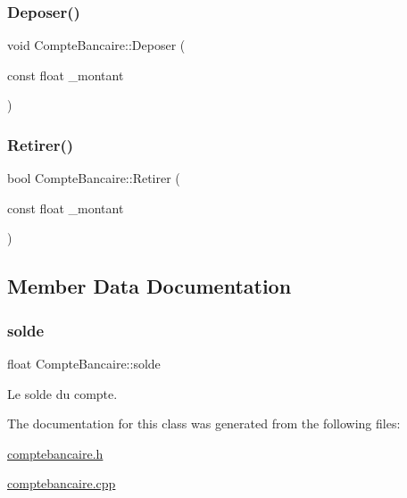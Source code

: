 \mbox{\label{class_compte_bancaire_a3e55bd1ec0622a9243a30a13e89266e1}} 
\subsubsection{\texorpdfstring{Deposer()}{Deposer()}}
{\footnotesize\ttfamily void Compte\+Bancaire\+::\+Deposer (\begin{DoxyParamCaption}\item[{const float}]{\+\_\+montant }\end{DoxyParamCaption})}

\mbox{\label{class_compte_bancaire_a9c313460924e7f125d39a34364eb7fa6}} 
\subsubsection{\texorpdfstring{Retirer()}{Retirer()}}
{\footnotesize\ttfamily bool Compte\+Bancaire\+::\+Retirer (\begin{DoxyParamCaption}\item[{const float}]{\+\_\+montant }\end{DoxyParamCaption})}



\subsection{Member Data Documentation}
\mbox{\label{class_compte_bancaire_a225c767a08a5e114bbf111509c4f4c94}} 
\subsubsection{\texorpdfstring{solde}{solde}}
{\footnotesize\ttfamily float Compte\+Bancaire\+::solde\hspace{0.3cm}{\ttfamily [protected]}}



Le solde du compte. 



The documentation for this class was generated from the following files\+:\begin{DoxyCompactItemize}
\item 
\hyperlink{comptebancaire_8h}{comptebancaire.\+h}\item 
\hyperlink{comptebancaire_8cpp}{comptebancaire.\+cpp}\end{DoxyCompactItemize}
